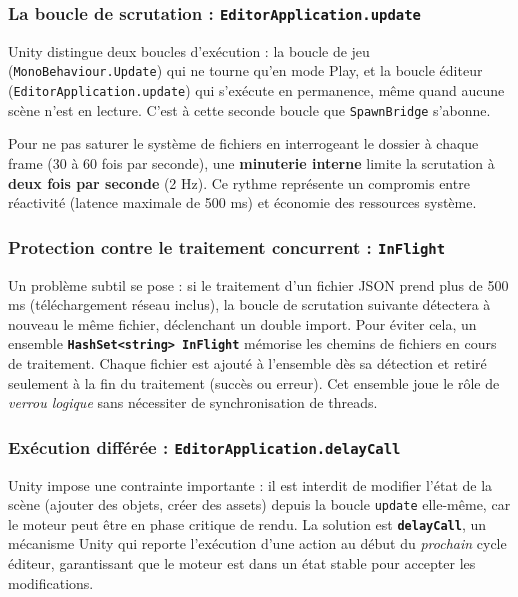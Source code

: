 \documentclass[12pt,a4paper,oneside]{report}
\begin{document}
\subsubsection{La boucle de scrutation : \texttt{EditorApplication.update}}

Unity distingue deux boucles d'exécution : la boucle de jeu
(\texttt{MonoBehaviour.Update}) qui ne tourne qu'en mode Play, et
la boucle éditeur (\texttt{EditorApplication.update}) qui s'exécute
en permanence, même quand aucune scène n'est en lecture. C'est à
cette seconde boucle que \texttt{SpawnBridge} s'abonne.

Pour ne pas saturer le système de fichiers en interrogeant le
dossier à chaque frame (30 à 60 fois par seconde), une
\textbf{minuterie interne} limite la scrutation à
\textbf{deux fois par seconde} (2 Hz). Ce rythme représente un
compromis entre réactivité (latence maximale de 500 ms) et
économie des ressources système.

\subsubsection{Protection contre le traitement concurrent : \texttt{InFlight}}

Un problème subtil se pose : si le traitement d'un fichier JSON prend
plus de 500 ms (téléchargement réseau inclus), la boucle de
scrutation suivante détectera à nouveau le même fichier, déclenchant
un double import. Pour éviter cela, un ensemble
\textbf{\texttt{HashSet<string> InFlight}} mémorise les chemins de
fichiers en cours de traitement. Chaque fichier est ajouté à l'ensemble
dès sa détection et retiré seulement à la fin du traitement
(succès ou erreur). Cet ensemble joue le rôle de \textit{verrou logique}
sans nécessiter de synchronisation de threads.

\subsubsection{Exécution différée : \texttt{EditorApplication.delayCall}}

Unity impose une contrainte importante : il est interdit de modifier
l'état de la scène (ajouter des objets, créer des assets) depuis
la boucle \texttt{update} elle-même, car le moteur peut être en phase
critique de rendu. La solution est \textbf{\texttt{delayCall}}, un
mécanisme Unity qui reporte l'exécution d'une action au début du
\textit{prochain} cycle éditeur, garantissant que le moteur est dans
un état stable pour accepter les modifications.
\end{document}
